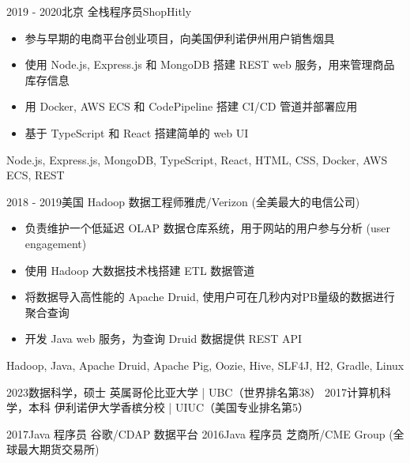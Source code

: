 \documentclass[alternative]{resume_template}
\begin{document}
\begin{experiences}
    \experience
    {2019 - 2020}{北京}
    {全栈程序员}{ShopHitly}
    {
        \begin{itemize}
            \item 参与早期的电商平台创业项目，向美国伊利诺伊州用户销售烟具
            \item 使用 Node.js, Express.js 和 MongoDB 搭建 REST web 服务，用来管理商品库存信息
            \item 用 Docker, AWS ECS 和 CodePipeline 搭建 CI/CD 管道并部署应用
            \item 基于 TypeScript 和 React 搭建简单的 web UI
        \end{itemize}
    }
    {Node.js, Express.js, MongoDB, TypeScript, React, HTML, CSS, Docker, AWS ECS, REST}

    \experience
    {2018 - 2019}{美国}
    {Hadoop 数据工程师}{雅虎/Verizon (全美最大的电信公司)}
    {
        \begin{itemize}
            \item 负责维护一个低延迟 OLAP 数据仓库系统，用于网站的用户参与分析 (user engagement)
            \item 使用 Hadoop 大数据技术栈搭建 ETL 数据管道
            \item 将数据导入高性能的 Apache Druid, 使用户可在几秒内对PB量级的数据进行聚合查询
            \item 开发 Java web 服务，为查询 Druid 数据提供 REST API
        \end{itemize}
    }
    {Hadoop, Java, Apache Druid, Apache Pig, Oozie, Hive, SLF4J, H2, Gradle, Linux}

\end{experiences}

\twocolumnsection
{
    \begin{internships}
        \internship 
        {2023}{数据科学，硕士}
        {英属哥伦比亚大学 | UBC（世界排名第38）}
        \vspace{5pt}
        \internship
        {2017}{计算机科学，本科}
        {伊利诺伊大学香槟分校 | UIUC（美国专业排名第5）}
    \end{internships}
}
{
    \begin{internships}
        \internship
        {2017}{Java 程序员}
        {谷歌/CDAP 数据平台}
        \vspace{5pt}
        \internship
        {2016}{Java 程序员}
        {芝商所/CME Group (全球最大期货交易所)}
    \end{internships}
}
\end{document}
